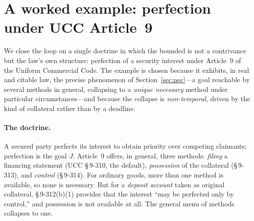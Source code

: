 \section{A worked example: perfection under UCC Article~9}
\label{sec:eval}

We close the loop on a single doctrine in which the bounded \MUST{} is not a contrivance
but the law's own structure: perfection of a security interest under Article~9 of the
Uniform Commercial Code. The example is chosen because it exhibits, in real and citable
law, the precise phenomenon of Section~\ref{sec:nec}---a goal reachable by several methods
in general, collapsing to a \emph{unique necessary} method under particular
circumstances---and because the collapse is \emph{non-temporal}, driven by the kind of
collateral rather than by a deadline.

\paragraph{The doctrine.} A secured party perfects its interest to obtain priority over
competing claimants; perfection is the goal $J$. Article~9 offers, in general, three
methods: \emph{filing} a financing statement (UCC \S\,9-310, the default),
\emph{possession} of the collateral (\S\,9-313), and \emph{control} (\S\,9-314). For
ordinary goods, more than one method is available, so none is necessary. But for a
\emph{deposit account} taken as original collateral, \S\,9-312(b)(1) provides that the
interest ``may be perfected only by control,'' and possession is not available at all. The
general menu of methods collapses to one.

